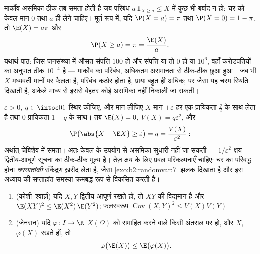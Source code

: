 \begin{example}[मार्कोव कब यथातथ होती है]\label{ex:b2:randomvar:markovsharp}
मार्कोव असमिका ठीक तब समता होती है जब परिबंध $a\,\mathbf 1_{X\geq a} \leq X$ में कुछ भी बर्बाद
न हो: चर को केवल मान $0$ तथा $a$ ही लेने चाहिए। मूर्त रूप में, यदि
$\P(X = a) = \pi$ तथा $\P(X = 0) = 1 - \pi$, तो $\E(X)
= a\pi$ और
\[
\P(X \geq a) = \pi = \frac{\E(X)}{a} .
\]
यथार्थ पाठ: जिस जनसंख्या में औसत संपत्ति $100$ हो और संपत्ति या तो
$0$ हो या $10^6$, वहाँ करोड़पतियों का अनुपात ठीक $10^{-4}$ है ---
मार्कोव का परिबंध, अधिकतम असमानता से ठीक-ठीक छुआ हुआ। जब भी $X$
मध्यवर्ती मानों पर फैलता है, परिबंध कठोर होता है, प्रायः बहुत ही
अधिक; पर जैसा यह चरम स्थिति दिखाती है, अकेले माध्य से इससे बेहतर
कोई असमिका नहीं निकाली जा सकती।
\end{example}

\begin{example}[चेबिशेव तीखी है --- और कोई अतिरिक्त परिकल्पना
नहीं]\label{ex:b2:randomvar:chebsharp}
$\varepsilon > 0$, $q \in \intoc01$ स्थिर कीजिए, और मान लीजिए $X$ मान $\pm\varepsilon$ हर एक प्रायिकता
$\frac q2$ के साथ लेता है तथा $0$ प्रायिकता $1 - q$ के साथ। तब $\E(X) = 0$, $V(X) =
q\varepsilon^2$, और
\[
\P\bigl(\abs{X - \E X} \geq \varepsilon\bigr) = q
= \frac{V(X)}{\varepsilon^2} :
\]
अर्थात् चेबिशेव में समता। अतः केवल  के उपयोग से असमिका सुधारी
नहीं जा सकती --- $1/\varepsilon^2$ क्षय द्वितीय-आघूर्ण सूचना का ठीक-ठीक मूल्य
है। तेज़ क्षय के लिए प्रबल परिकल्पनाएँ चाहिए: चर का परिबद्ध होना
\emph{चरघातांकी} संकेंद्रण ख़रीद लेता है, जैसा \cref{exo:b2:randomvar:7} झलक दिखाता है
और इस अध्याय की सप्ताहांत समस्या क्रमबद्ध रूप से विकसित करती है।
\end{example}

\begin{theorem}[कोशी--श्वार्ज़ और जेनसन]\label{thm:b2:randomvar:jensen}
\leavevmode
\begin{enumerate}
\item (कोशी--श्वार्ज़) यदि $X, Y$ द्वितीय आघूर्ण रखते हों, तो $XY$ की
 विद्यमान है और $\E(XY)^2 \leq \E(X^2)\,\E(Y^2)$; फलस्वरूप $\operatorname{Cov}(X,Y)^2 \leq V(X)V(Y)$।
\item (जेनसन) यदि $\varphi \colon I \to \R$ $X(\Omega)$ को समाहित करने वाले किसी अंतराल पर 
हो, और $X$, $\varphi(X)$  रखते हों, तो
\[
\varphi\bigl(\E(X)\bigr) \leq \E\bigl(\varphi(X)\bigr) .
\]
\end{enumerate}
\end{theorem}

